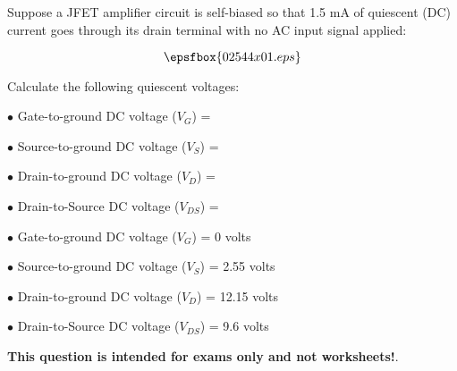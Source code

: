 

Suppose a JFET amplifier circuit is self-biased so that 1.5 mA of quiescent (DC) current goes through its drain terminal with no AC input signal applied:

$$\epsfbox{02544x01.eps}$$

Calculate the following quiescent voltages:

\medskip
\item{$\bullet$} Gate-to-ground DC voltage ($V_G$) = 
\item{$\bullet$} Source-to-ground DC voltage ($V_S$) =
\item{$\bullet$} Drain-to-ground DC voltage ($V_D$) =
\item{$\bullet$} Drain-to-Source DC voltage ($V_{DS}$) =
\medskip







\medskip
\item{$\bullet$} Gate-to-ground DC voltage ($V_G$) = 0 volts
\item{$\bullet$} Source-to-ground DC voltage ($V_S$) = 2.55 volts
\item{$\bullet$} Drain-to-ground DC voltage ($V_D$) = 12.15 volts
\item{$\bullet$} Drain-to-Source DC voltage ($V_{DS}$) = 9.6 volts
\medskip







{\bf This question is intended for exams only and not worksheets!}.




